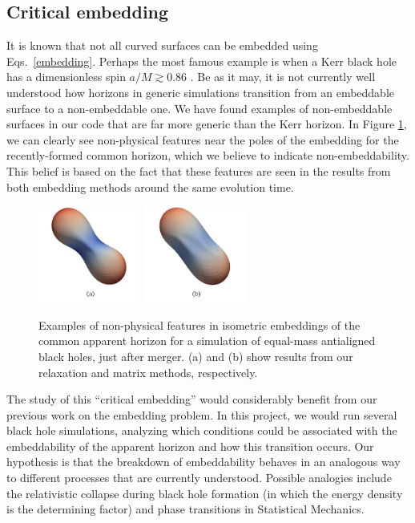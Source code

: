 \documentclass{../letter}
\newcommand{\eqs}[1]{Eqs.~\eqref{#1}}
\newcommand{\fig}[2][\empty]{Figure \hyperref[fig:#2]{\ref{fig:#2}#1}}
\begin{document}
	\subsection{Critical embedding}

	It is known that not all curved surfaces can be embedded using \eqs{embedding}. Perhaps the most famous example is when a Kerr black hole has a dimensionless spin $a/M \gtrsim 0.86$ \cite[chapter 15]{hartle}. Be as it may, it is not currently well understood how horizons in generic simulations transition from an embeddable surface to a non-embeddable one. We have found examples of non-embeddable surfaces in our code that are far more generic than the Kerr horizon. In \fig{nonembeddable}, we can clearly see non-physical features near the poles of the embedding for the recently-formed common horizon, which we believe to indicate non-embeddability. This belief is based on the fact that these features are seen in the results from both embedding methods around the same evolution time.

	\begin{figure}[H]
		\centering
		\includegraphics[height=120px]{assets/AntiAlignedSharp_Relaxation.png}
		\includegraphics[height=120px]{assets/AntiAlignedSharp_Matrix.png}
		\caption{Examples of non-physical features in isometric embeddings of the common apparent horizon for a simulation of equal-mass antialigned black holes, just after merger. (a) and (b) show results from our relaxation and matrix methods, respectively.}
		\label{fig:nonembeddable}
	\end{figure}
	
	The study of this ``critical embedding'' would considerably benefit from our previous work on the embedding problem. In this project, we would run several black hole simulations, analyzing which conditions could be associated with the embeddability of the apparent horizon and how this transition occurs. Our hypothesis is that the breakdown of embeddability behaves in an analogous way to different processes that are currently understood. Possible analogies include the relativistic collapse during black hole formation (in which the energy density is the determining factor) and phase transitions in Statistical Mechanics.
\end{document}
